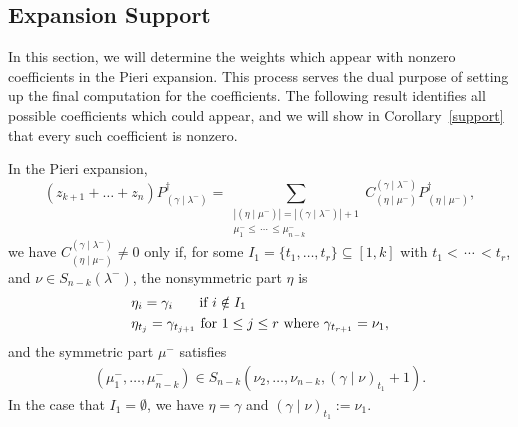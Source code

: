 \documentclass[ALCO]{cedram}
\newcommand{\PB}[1]{P_{#1}^\dagger}
\newcommand{\gammalambdamin}{{(\gamma \mid \lambda^-)}}
\newcommand{\gammanu}{{(\gamma \mid \nu)}}
\newcommand{\etamu}{{(\eta \mid \mu^-)}}
\begin{document}
    \subsection{Expansion Support}
In this section, we will determine the weights which appear with nonzero coefficients in the Pieri expansion. This process serves the dual purpose of setting up the final computation for the coefficients. The following result identifies all possible coefficients which could appear, and we will show in Corollary~\ref{support} that every such coefficient is nonzero.
\begin{prop}\label{expansion}
In the Pieri expansion,
\[ (z_{k+1} + \dots + z_n)\PB{\gammalambdamin} = \sum_{\substack{|\etamu| = |\gammalambdamin| + 1 \\[1mm] \mu^-_1 \leq \, \dotsm \, \leq \mu^-_{n-k} }} C^{\gammalambdamin}_{\etamu} \PB{\etamu}, \]
we have $C^{\gammalambdamin}_{\etamu}\neq 0$ only if, for some $I_1=\{t_1, \dots, t_r\} \subseteq [1,k]$ with $t_1 < \, \dotsm \, < t_r$, and $\nu \in S_{n-k}(\lambda^-)$, the nonsymmetric part $\eta$ is
\begin{align*}
    &\eta_i = \gamma_i \hspace*{.55cm}\text{ if } i\notin I_1\\
    &\eta_{t_j}=\gamma_{t_{j+1}} \text{ for } 1\leq j \leq r \text{ where } \gamma_{t_{r+1}} = \nu_1,
\end{align*}
and the symmetric part $\mu^-$ satisfies
\begin{align*}
    (\mu_1^-, \dotsc, \mu_{n-k}^- ) \in S_{n-k}(\nu_2, \dotsc, \nu_{n-k}, \gammanu_{t_1}+1).
\end{align*}
In the case that $I_1 = \emptyset$, we have $\eta = \gamma$ and $\gammanu_{t_1} := \nu_1$.
\end{prop}
\end{document}
